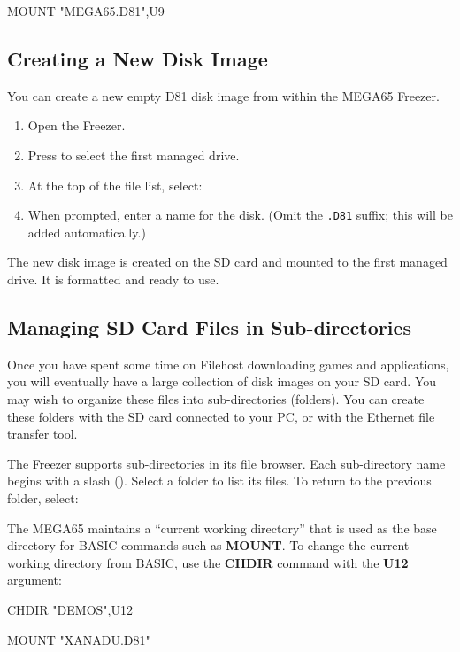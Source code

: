 \begin{screencode}
MOUNT "MEGA65.D81",U9
\end{screencode}

\subsection{Creating a New Disk Image}

You can create a new empty D81 disk image from within the MEGA65 Freezer.

\begin{enumerate}
\item Open the Freezer.
\item Press  to select the first managed drive.
\item At the top of the file list, select: 
\item When prompted, enter a name for the disk. (Omit the {\tt .D81} suffix; this will be added automatically.)
\end{enumerate}

The new disk image is created on the SD card and mounted to the first managed drive. It is formatted and ready to use.

\subsection{Managing SD Card Files in Sub-directories}

Once you have spent some time on Filehost downloading games and applications, you will eventually have a large collection of disk images on your SD card. You may wish to organize these files into sub-directories (folders). You can create these folders with the SD card connected to your PC, or with the Ethernet file transfer tool.

The Freezer supports sub-directories in its file browser. Each sub-directory name begins with a slash (\screentext{/}). Select a folder to list its files. To return to the previous folder, select: 

The MEGA65 maintains a ``current working directory'' that is used as the base directory for BASIC commands such as {\bf MOUNT}. To change the current working directory from BASIC, use the {\bf CHDIR} command with the {\bf U12} argument:

\begin{screencode}
CHDIR "DEMOS",U12

MOUNT "XANADU.D81"
\end{screencode}

